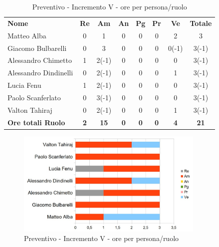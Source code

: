 \begin{table} [h!]
	\begin{center}
		\begin{tabular} { m{3.5cm} c c c c c c c }
			\rowcolor{lightgray}
			\textbf{Nome} & \textbf{Re} & \textbf{Am} & \textbf{An} & \textbf{Pg} & \textbf{Pr} & \textbf{Ve} & \textbf{Totale} \\
			Matteo Alba & 0 & 1 & 0 & 0 & 0 & 2 & 3 \\
			Giacomo Bulbarelli & 0 & 3 & 0 & 0 & 0 & 0(-1) & 3(-1) \\
			Alessandro Chimetto & 1 & 2(-1) & 0 & 0 & 0 & 0 & 3(-1)\\
			Alessandro Dindinelli & 0 & 2(-1) & 0 & 0 & 0 & 1 & 3(-1) \\
			Lucia Fenu & 1 & 2(-1) & 0 & 0 & 0 & 0 & 3(-1) \\
			Paolo Scanferlato & 0 & 3(-1) & 0 & 0 & 0 & 0 & 3(-1) \\
			Valton Tahiraj & 0 & 2(-1) & 0 & 0 & 0 & 1 & 3(-1)\\
			\textbf{Ore totali Ruolo} & \textbf{2} & \textbf{15} & \textbf{0} & \textbf{0} & \textbf{0}& \textbf{4} & \textbf{21}
		\end{tabular}
		\caption{Preventivo - Incremento V - ore per persona/ruolo}
	\end{center}
\end{table}
\begin{figure} [h!]
	\centering
	\includegraphics[width=0.8\textwidth]{res/img/grafici/Incremento5Ore.jpg}
	\caption{Preventivo - Incremento V - ore per persona/ruolo} 
\end{figure}

\newpage
